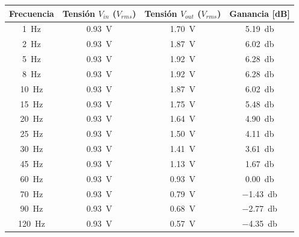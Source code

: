 \begin{table}[H]
  \centering
  \begin{tabular}{cccc}
    \hline
    \textbf{Frecuencia} & \textbf{Tensión $V_{in}$ ($V_{rms}$)} & \textbf{Tensión $V_{out}$ ($V_{rms}$)} & \textbf{Ganancia [dB]} \\ \hline
    \SI{1}{\hertz}       & \SI{0.93}{\volt}                      & \SI{1.70}{\volt}                       & \SI{5.19}{\decibel}    \\
    \SI{2}{\hertz}       & \SI{0.93}{\volt}                      & \SI{1.87}{\volt}                       & \SI{6.02}{\decibel}    \\
    \SI{5}{\hertz}       & \SI{0.93}{\volt}                      & \SI{1.92}{\volt}                       & \SI{6.28}{\decibel}    \\
    \SI{8}{\hertz}       & \SI{0.93}{\volt}                      & \SI{1.92}{\volt}                       & \SI{6.28}{\decibel}    \\
    \SI{10}{\hertz}      & \SI{0.93}{\volt}                      & \SI{1.87}{\volt}                       & \SI{6.02}{\decibel}    \\
    \SI{15}{\hertz}      & \SI{0.93}{\volt}                      & \SI{1.75}{\volt}                       & \SI{5.48}{\decibel}    \\
    \SI{20}{\hertz}      & \SI{0.93}{\volt}                      & \SI{1.64}{\volt}                       & \SI{4.90}{\decibel}    \\
    \SI{25}{\hertz}      & \SI{0.93}{\volt}                      & \SI{1.50}{\volt}                       & \SI{4.11}{\decibel}    \\
    \SI{30}{\hertz}      & \SI{0.93}{\volt}                      & \SI{1.41}{\volt}                       & \SI{3.61}{\decibel}    \\
    \SI{45}{\hertz}      & \SI{0.93}{\volt}                      & \SI{1.13}{\volt}                       & \SI{1.67}{\decibel}    \\
    \SI{60}{\hertz}      & \SI{0.93}{\volt}                      & \SI{0.93}{\volt}                       & \SI{0.00}{\decibel}    \\
    \SI{70}{\hertz}      & \SI{0.93}{\volt}                      & \SI{0.79}{\volt}                       & \SI{-1.43}{\decibel}   \\
    \SI{90}{\hertz}      & \SI{0.93}{\volt}                      & \SI{0.68}{\volt}                       & \SI{-2.77}{\decibel}   \\
    \SI{120}{\hertz}     & \SI{0.93}{\volt}                      & \SI{0.57}{\volt}                       & \SI{-4.35}{\decibel}   \\

\end{tabular}
\end{table}

